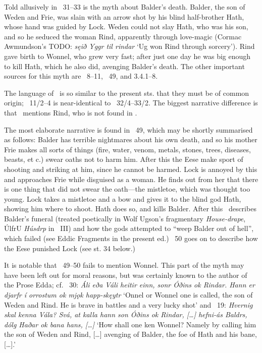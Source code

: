 {\small Told allusively in \Voluspa\ 31–33 is the myth about Balder’s death.  Balder, the son of Weden and Frie, was slain with an arrow shot by his blind half-brother Hath, whose hand was guided by Lock.  Weden could not slay Hath, who was his son, and so he seduced the woman Rind, apparently through love-magic (Cormac Awmundson’s TODO: \emph{sęið Yggr til rindar} ‘Ug won Rind through sorcery’).  Rind gave birth to Wonnel, who grew very fast; after just one day he was big enough to kill Hath, which he also did, avenging Balder’s death.  The other important sources for this myth are \Baldrsdraumar\ 8–11, \Gylfaginning\ 49, and \textcite{Saxo} 3.4.1–8.

The language of \Baldrsdraumar\ is so similar to the present sts. that they must be of common origin; \Baldrsdraumar\ 11/2–4 is near-identical to \Voluspa\ 32/4–33/2.  The biggest narrative difference is that \Baldrsdraumar\ mentions Rind, who is not found in \Voluspa.

The most elaborate narrative is found in \Gylfaginning\ 49, which may be shortly summarised as follows: Balder has terrible nightmares about his own death, and so his mother Frie makes all sorts of things (fire, water, venom, metals, stones, trees, diseases, beasts, et c.) swear oaths not to harm him.  After this the Eese make sport of shooting and striking at him, since he cannot be harmed.  Lock is annoyed by this and approaches Frie while disguised as a woman.  He finds out from her that there is one thing that did not swear the oath—the mistletoe, which was thought too young.  Lock takes a mistletoe and a bow and gives it to the blind god Hath, showing him where to shoot.  Hath does so, and kills Balder.  After this \Gylfaginning\ describes Balder’s funeral (treated poetically in Wolf Ugson’s fragmentary \emph{House-drape}, ÚlfrU \emph{Húsdrp} in \Skp\ III) and how the gods attempted to “weep Balder out of hell”, which failed (see Eddic Fragments in the present ed.)  \Gylfaginning\ 50 goes on to describe how the Eese punished Lock (see st. 34 below.)

It is notable that \Gylfaginning\ 49–50 fails to mention Wonnel.  This part of the myth may have been left out for moral reasons, but was certainly known to the author of the Prose Edda; cf. \Gylfaginning\ 30: \emph{Áli eða Váli heitir einn, sonr Óðins ok Rindar. Hann er djarfr í orrostum ok mjǫk happ-skęytr} ‘Onnel or Wonnel one is called, the son of Weden and Rind. He is brave in battles and a very lucky shot’ and \Skaldskaparmal\ 19: \emph{Hvernig skal kenna Vála? Svá, at kalla hann son Óðins ok Rindar, [\dots] hefni-ás Baldrs, dólg Haðar ok bana hans, [\dots]} ‘How shall one ken Wonnel? Namely by calling him the son of Weden and Rind, [\dots] avenging  of Balder, the foe of Hath and his bane, [\dots].’

}
